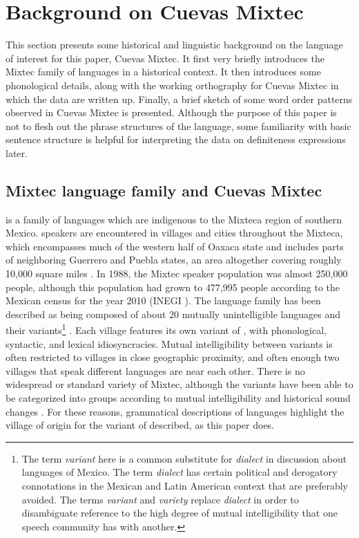 \documentclass[output=paper,modfonts,nonflat]{langsci/langscibook}
\begin{document}
\section{Background on Cuevas Mixtec} \label{sec:cisneros:3}

This section presents some historical and linguistic background on the language of interest for this paper, Cuevas Mixtec.  It first very briefly introduces the Mixtec family of languages in a historical context.  It then introduces some phonological details, along with the working orthography for Cuevas Mixtec in which the data are written up.  Finally, a brief sketch of some word order patterns observed in Cuevas Mixtec is presented.  Although the purpose of this paper is not to flesh out the phrase structures of the language, some familiarity with basic sentence structure is helpful for interpreting the data on definiteness expressions later.

\subsection{Mixtec language family and Cuevas Mixtec} \label{sec:cisneros:3.1}

 is a family of languages which are indigenous to the Mixteca region of southern Mexico.   speakers are encountered in villages and cities throughout the Mixteca, which encompasses much of the western half of Oaxaca state and includes parts of neighboring Guerrero and Puebla states, an area altogether covering roughly 10,000 square miles \citep{Bradley1988}.  In 1988, the Mixtec speaker population was almost 250,000 people, although this population had grown to 477,995 people according to the Mexican census for the year 2010 (INEGI \citeyear{inegi2010}).  The language family has been described as being composed of about 20 mutually unintelligible languages and their variants\footnote{The term \emph{variant} here is a common substitute for \emph{dialect} in discussion about languages of Mexico. The term \emph{dialect} has certain political and derogatory connotations in the Mexican and Latin American context that are preferably avoided.  The terms \emph{variant} and \emph{variety} replace \emph{dialect} in order to disambiguate reference to the high degree of mutual intelligibility that one speech community has with another.} \citep{Bradley1988}.  Each village features its own variant of , with phonological, syntactic, and lexical idiosyncracies.  Mutual intelligibility between variants is often restricted to villages in close geographic proximity, and often enough two villages that speak different  languages are near each other.  There is no widespread or standard variety of Mixtec, although the variants have been able to be categorized into groups according to mutual intelligibility \citep[25--37]{Egland1978} and historical sound changes \citep{Josserand1983}.  For these reasons, grammatical descriptions of  languages highlight the village of origin for the variant of  described, as this paper does.
\end{document}
